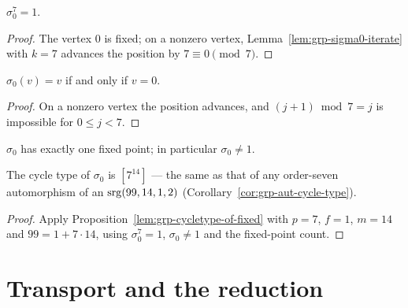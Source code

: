 \begin{lemma}\label{lem:grp-sigma0-order}
$\sigma_0^7 = 1$.
\leanok
{}
\end{lemma}

\begin{proof}\leanok
{}
The vertex $0$ is fixed; on a nonzero vertex,
Lemma~\ref{lem:grp-sigma0-iterate} with $k = 7$ advances the position by
$7 \equiv 0 \pmod 7$.
\end{proof}

\begin{lemma}\label{lem:grp-sigma0-fixed-iff}
$\sigma_0(v) = v$ if and only if $v = 0$.
\leanok
{}
\end{lemma}

\begin{proof}\leanok
On a nonzero vertex the position advances, and $(j+1) \bmod 7 = j$ is
impossible for $0 \le j < 7$.
\end{proof}

\begin{lemma}\label{lem:grp-sigma0-fixed-card}
$\sigma_0$ has exactly one fixed point; in particular $\sigma_0 \ne 1$.
\leanok
{}
\end{lemma}

\begin{lemma}\label{lem:grp-sigma0-cycle-type}
The cycle type of $\sigma_0$ is $[7^{14}]$ --- the same as that of any
order-seven automorphism of an $\mathrm{srg}(99,14,1,2)$
(Corollary~\ref{cor:grp-aut-cycle-type}).
\leanok
{}
\end{lemma}

\begin{proof}\leanok
{}
Apply Proposition~\ref{lem:grp-cycletype-of-fixed} with $p = 7$, $f = 1$,
$m = 14$ and $99 = 1 + 7 \cdot 14$, using $\sigma_0^7 = 1$, $\sigma_0 \ne 1$
and the fixed-point count.
\end{proof}

\section{Transport and the reduction}

